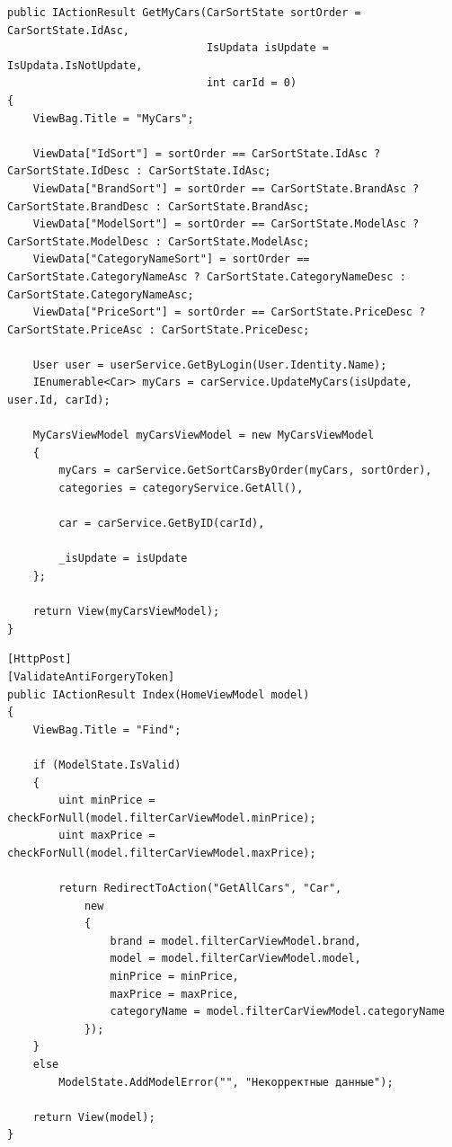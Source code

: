 \documentclass[a4paper,14pt, unknownkeysallowed]{extreport}
\begin{document}
\begin{center}
\captionsetup{justification=raggedright,singlelinecheck=off}
\begin{lstlisting}[label=lst:GetMyCars,caption=Функция вывода всех добавленных в корзину автомобилей]
public IActionResult GetMyCars(CarSortState sortOrder = CarSortState.IdAsc,
							   IsUpdata isUpdate = IsUpdata.IsNotUpdate, 
							   int carId = 0)
{
	ViewBag.Title = "MyCars";

	ViewData["IdSort"] = sortOrder == CarSortState.IdAsc ? CarSortState.IdDesc : CarSortState.IdAsc;
	ViewData["BrandSort"] = sortOrder == CarSortState.BrandAsc ? CarSortState.BrandDesc : CarSortState.BrandAsc;
	ViewData["ModelSort"] = sortOrder == CarSortState.ModelAsc ? CarSortState.ModelDesc : CarSortState.ModelAsc;
	ViewData["CategoryNameSort"] = sortOrder == CarSortState.CategoryNameAsc ? CarSortState.CategoryNameDesc : CarSortState.CategoryNameAsc;
	ViewData["PriceSort"] = sortOrder == CarSortState.PriceDesc ? CarSortState.PriceAsc : CarSortState.PriceDesc;

	User user = userService.GetByLogin(User.Identity.Name);
	IEnumerable<Car> myCars = carService.UpdateMyCars(isUpdate, user.Id, carId);

	MyCarsViewModel myCarsViewModel = new MyCarsViewModel
	{
		myCars = carService.GetSortCarsByOrder(myCars, sortOrder),
		categories = categoryService.GetAll(),

		car = carService.GetByID(carId),

		_isUpdate = isUpdate
	};

	return View(myCarsViewModel);
}
\end{lstlisting}
\end{center}

\clearpage

\begin{center}
\captionsetup{justification=raggedright,singlelinecheck=off}
\begin{lstlisting}[label=lst:Index,caption=Функция поиска автомобилей по заданным параметрам]
[HttpPost]
[ValidateAntiForgeryToken]
public IActionResult Index(HomeViewModel model)
{
	ViewBag.Title = "Find";

	if (ModelState.IsValid)
	{
		uint minPrice = checkForNull(model.filterCarViewModel.minPrice);
		uint maxPrice = checkForNull(model.filterCarViewModel.maxPrice);

		return RedirectToAction("GetAllCars", "Car",
			new
			{
				brand = model.filterCarViewModel.brand,
				model = model.filterCarViewModel.model,
				minPrice = minPrice,
				maxPrice = maxPrice,
				categoryName = model.filterCarViewModel.categoryName
			});
	}
	else
		ModelState.AddModelError("", "Некорректные данные");

	return View(model);
}
\end{lstlisting}
\end{center}
\end{document}
